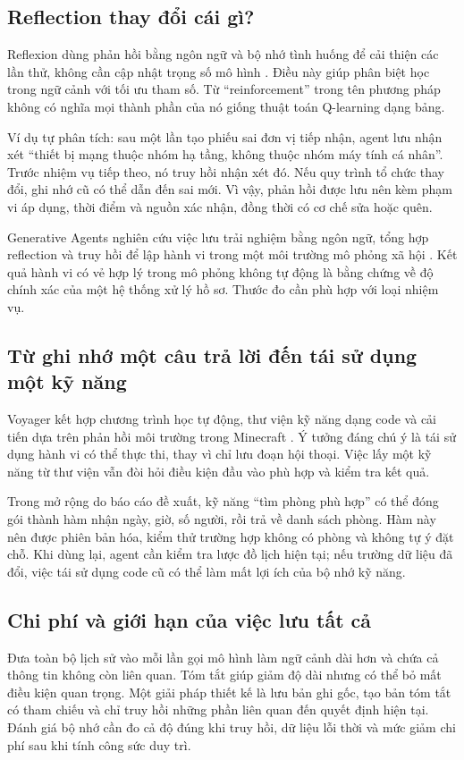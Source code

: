 \subsection{Reflection thay đổi cái gì?}
Reflexion dùng phản hồi bằng ngôn ngữ và bộ nhớ tình huống để cải thiện các lần thử,
không cần cập nhật trọng số mô hình \cite{reflexion}. Điều này giúp phân biệt học
trong ngữ cảnh với tối ưu tham số. Từ ``reinforcement'' trong tên phương pháp không
có nghĩa mọi thành phần của nó giống thuật toán Q-learning dạng bảng.

Ví dụ tự phân tích: sau một lần tạo phiếu sai đơn vị tiếp nhận, agent lưu nhận xét
``thiết bị mạng thuộc nhóm hạ tầng, không thuộc nhóm máy tính cá nhân''. Trước nhiệm
vụ tiếp theo, nó truy hồi nhận xét đó. Nếu quy trình tổ chức thay đổi, ghi nhớ cũ có
thể dẫn đến sai mới. Vì vậy, phản hồi được lưu nên kèm phạm vi áp dụng, thời điểm và
nguồn xác nhận, đồng thời có cơ chế sửa hoặc quên.

Generative Agents nghiên cứu việc lưu trải nghiệm bằng ngôn ngữ, tổng hợp reflection
và truy hồi để lập hành vi trong một môi trường mô phỏng xã hội \cite{generative}.
Kết quả hành vi có vẻ hợp lý trong mô phỏng không tự động là bằng chứng về độ chính
xác của một hệ thống xử lý hồ sơ. Thước đo cần phù hợp với loại nhiệm vụ.

\subsection{Từ ghi nhớ một câu trả lời đến tái sử dụng một kỹ năng}
Voyager kết hợp chương trình học tự động, thư viện kỹ năng dạng code và cải tiến dựa
trên phản hồi môi trường trong Minecraft \cite{voyager}. Ý tưởng đáng chú ý là tái
sử dụng hành vi có thể thực thi, thay vì chỉ lưu đoạn hội thoại. Việc lấy một kỹ năng
từ thư viện vẫn đòi hỏi điều kiện đầu vào phù hợp và kiểm tra kết quả.

Trong mở rộng do báo cáo đề xuất, kỹ năng ``tìm phòng phù hợp'' có thể đóng gói thành
hàm nhận ngày, giờ, số người, rồi trả về danh sách phòng. Hàm này nên được phiên bản
hóa, kiểm thử trường hợp không có phòng và không tự ý đặt chỗ. Khi dùng lại, agent
cần kiểm tra lược đồ lịch hiện tại; nếu trường dữ liệu đã đổi, việc tái sử dụng code
cũ có thể làm mất lợi ích của bộ nhớ kỹ năng.

\subsection{Chi phí và giới hạn của việc lưu tất cả}
Đưa toàn bộ lịch sử vào mỗi lần gọi mô hình làm ngữ cảnh dài hơn và chứa cả thông tin
không còn liên quan. Tóm tắt giúp giảm độ dài nhưng có thể bỏ mất điều kiện quan trọng.
Một giải pháp thiết kế là lưu bản ghi gốc, tạo bản tóm tắt có tham chiếu và chỉ truy
hồi những phần liên quan đến quyết định hiện tại. Đánh giá bộ nhớ cần đo cả độ đúng
khi truy hồi, dữ liệu lỗi thời và mức giảm chi phí sau khi tính công sức duy trì.

